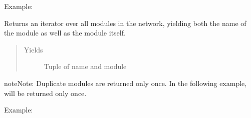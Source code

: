\documentclass[letterpaper,10pt,english]{sphinxmanual}
\begin{document}
\begin{fulllineitems}
\begin{fulllineitems}
\begin{quote}
\begin{description}
\end{description}\end{quote}

Example:

\begin{sphinxVerbatim}[commandchars=\\\{\}]
    
       \PYG{p}{[} \PYG{p}{]}
        
\end{sphinxVerbatim}

\end{fulllineitems}


\begin{fulllineitems}
\label{\detokenize{api/dynamics:geology.metamodelling.dynamics.LatentSpaceDynamics.named_modules}}
Returns an iterator over all modules in the network, yielding
both the name of the module as well as the module itself.
\begin{quote}\begin{description}
\item[{Yields}] \leavevmode
{} \textendash{} Tuple of name and module

\end{description}\end{quote}

\begin{sphinxadmonition}{note}{Note:}
Duplicate modules are returned only once. In the following
example,  will be returned only once.
\end{sphinxadmonition}

Example:


\end{fulllineitems}
\end{fulllineitems}
\end{document}
